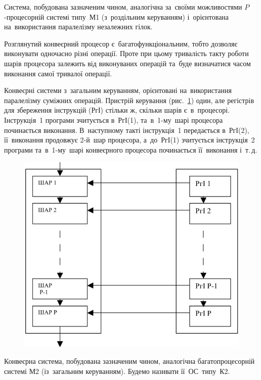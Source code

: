 \documentclass[
	a4paper,
	oneside,
	BCOR = 10mm,
	DIV = 12,
	12pt,
	headings = normal,
]{scrartcl}
\begin{document}
		Система, побудована зазначеним чином, аналогічна за~своїми можливостями $P$-процесорній системі типу~М1 (з~роздільним керуванням) і~орієнтована на~використання паралелізму незалежних гілок.

		Розглянутий конвеєрний процесор є~багатофункціональним, тобто дозволяє виконувати одночасно різні операції. Проте при цьому тривалість такту роботи шарів процесора залежить від виконуваних операцій та~буде визначатися часом виконання самої тривалої операції.

		Конвеєрні системи з~загальним керуванням, орієнтовані на~використання паралелізму суміжних операцій. Пристрій керування (рис.~\ref{fig:mpp-t02}) один, але регістрів для збереження інструкцій (РгІ) стільки ж, скільки шарів є~в~процесорі. Інструкція~1 програми зчитується в~РгІ(1), та~в~1-му~шарі процесора починається виконання. В~наступному такті інструкція~1 передається в~РгІ(2), її~виконання продовжує 2-й~шар процесора, а~до~РгІ(1) зчитується інструкція~2 програми та~в~1-му~шарі конвеєрного процесора починається її~виконання і~т.\,д.

		\begin{figure}[!htbp]
			\centering
			\includegraphics[height=14\baselineskip]{./assets/y03s02-compsys-lab-05-p01-mpp-t02.jpg}
			\caption{}
			\label{fig:mpp-t02}
		\end{figure}

		Конвеєрна система, побудована зазначеним чином, аналогічна багатопроцесорній системі М2 (із~загальним керуванням). Будемо називати її~ОС~типу~К2.
\end{document}
